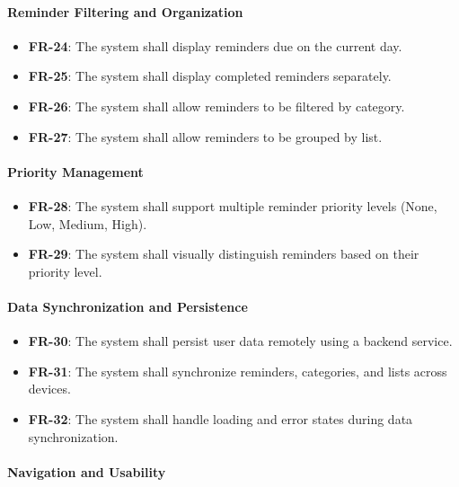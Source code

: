 \documentclass[runningheads,a4paper]{llncs}
\begin{document}
\paragraph{Reminder Filtering and Organization}

\begin{itemize}
  \item \textbf{FR-24}: The system shall display reminders due on the current day.
  \item \textbf{FR-25}: The system shall display completed reminders separately.
  \item \textbf{FR-26}: The system shall allow reminders to be filtered by category.
  \item \textbf{FR-27}: The system shall allow reminders to be grouped by list.
\end{itemize}

\paragraph{Priority Management}

\begin{itemize}
  \item \textbf{FR-28}: The system shall support multiple reminder priority levels (None, Low, Medium, High).
  \item \textbf{FR-29}: The system shall visually distinguish reminders based on their priority level.
\end{itemize}

\paragraph{Data Synchronization and Persistence}

\begin{itemize}
  \item \textbf{FR-30}: The system shall persist user data remotely using a backend service.
  \item \textbf{FR-31}: The system shall synchronize reminders, categories, and lists across devices.
  \item \textbf{FR-32}: The system shall handle loading and error states during data synchronization.
\end{itemize}

\paragraph{Navigation and Usability}
\end{document}
